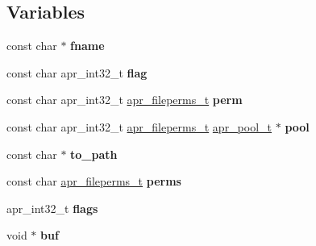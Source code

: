 \subsection*{Variables}
\begin{DoxyCompactItemize}
\item 
\mbox{\label{group__apr__file__io_ga6a2fc0c236288b07ce5bd1335ca89fa2}} 
const char $\ast$ {\bfseries fname}
\item 
\mbox{\label{group__apr__file__io_ga369aab3d9c81d361edfc877cd50e47c0}} 
const char apr\+\_\+int32\+\_\+t {\bfseries flag}
\item 
\mbox{\label{group__apr__file__io_gaea9bb24f3d4ad784f5f7823426409c54}} 
const char apr\+\_\+int32\+\_\+t \mbox{\hyperlink{group__apr__file__info_ga3af19c4c47007169064a70f9351bc7d8}{apr\+\_\+fileperms\+\_\+t}} {\bfseries perm}
\item 
\mbox{\label{group__apr__file__io_ga35230907c170df5d4d7f0ca99274c574}} 
const char apr\+\_\+int32\+\_\+t \mbox{\hyperlink{group__apr__file__info_ga3af19c4c47007169064a70f9351bc7d8}{apr\+\_\+fileperms\+\_\+t}} \mbox{\hyperlink{group__apr__pools_gaf137f28edcf9a086cd6bc36c20d7cdfb}{apr\+\_\+pool\+\_\+t}} $\ast$ {\bfseries pool}
\item 
\mbox{\label{group__apr__file__io_gade8b1804d30cef013de36302728fd81c}} 
const char $\ast$ {\bfseries to\+\_\+path}
\item 
\mbox{\label{group__apr__file__io_ga1a04dd4c8d58f3a54ba16d47d78ba04c}} 
const char \mbox{\hyperlink{group__apr__file__info_ga3af19c4c47007169064a70f9351bc7d8}{apr\+\_\+fileperms\+\_\+t}} {\bfseries perms}
\item 
\mbox{\label{group__apr__file__io_gac16a2ffc0f356916a4e49b5f90a6127d}} 
apr\+\_\+int32\+\_\+t {\bfseries flags}
\item 
\mbox{\label{group__apr__file__io_ga0ccd7535cf45ea4a389b855324c47142}} 
void $\ast$ {\bfseries buf}
\item 
\mbox{\label{group__apr__file__io_ga19e46b20186d519fe175ae699db0008d}} 

\end{DoxyCompactItemize}
